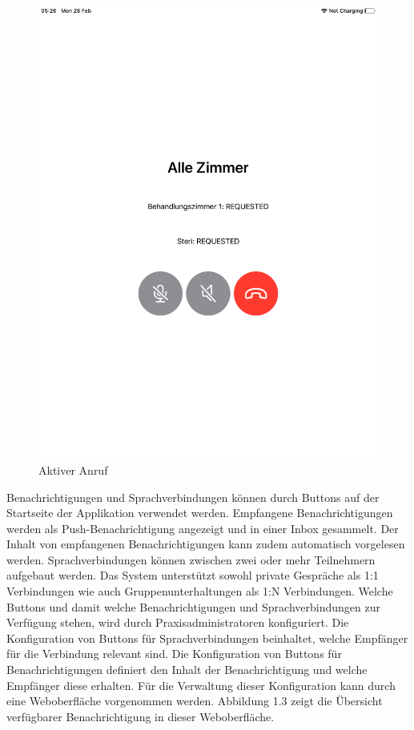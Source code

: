 \begin{figure}[h]
\begin{minipage}[b]{0.4\textwidth}
        \includegraphics[width=\textwidth]{graphics/screenshots/app/call}
        \caption{Aktiver Anruf}
    \end{minipage}
    \label{fig:MobileClient-ScreensIntroduction}
\end{figure}

Benachrichtigungen und Sprachverbindungen können durch Buttons auf der Startseite der Applikation verwendet werden.
Empfangene Benachrichtigungen werden als Push-Benachrichtigung angezeigt und in einer Inbox gesammelt.
Der Inhalt von empfangenen Benachrichtigungen kann zudem automatisch vorgelesen werden.
Sprachverbindungen können zwischen zwei oder mehr Teilnehmern aufgebaut werden.
Das System unterstützt sowohl private Gespräche als 1:1 Verbindungen wie auch Gruppenunterhaltungen als 1:N Verbindungen.
Welche Buttons und damit welche Benachrichtigungen und Sprachverbindungen zur Verfügung stehen, wird durch Praxisadministratoren konfiguriert.
Die Konfiguration von Buttons für Sprachverbindungen beinhaltet, welche Empfänger für die Verbindung relevant sind.
Die Konfiguration von Buttons für Benachrichtigungen definiert den Inhalt der Benachrichtigung und  welche Empfänger diese erhalten.
Für die Verwaltung dieser Konfiguration kann durch eine Weboberfläche vorgenommen werden.
Abbildung 1.3 zeigt die Übersicht verfügbarer Benachrichtigung in dieser Weboberfläche.

